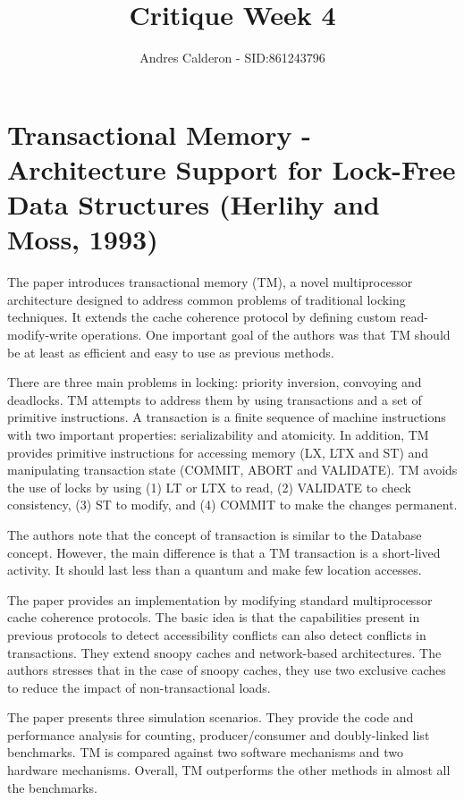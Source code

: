 \documentclass[a4paper,10pt]{scrartcl}
\title{Critique Week 4}
\author{Andres Calderon - SID:861243796}
\begin{document}
\maketitle
\thispagestyle{empty}

\section*{Transactional Memory - Architecture Support for Lock-Free Data Structures (Herlihy and Moss, 1993)}
The paper introduces transactional memory (TM), a novel multiprocessor  architecture designed to address common problems of traditional locking techniques.  It extends the cache coherence protocol by defining custom read-modify-write operations.  One important goal of the authors was that TM should be at least as efficient and easy to use as previous methods.

There are three main problems in locking: priority inversion, convoying and deadlocks.  TM attempts to address them by using transactions and a set of primitive instructions.  A transaction is a finite sequence of machine instructions with two important properties: serializability and atomicity. In addition, TM provides primitive instructions for accessing memory (LX, LTX and ST) and manipulating transaction state (COMMIT, ABORT and VALIDATE).  TM avoids the use of locks by using (1) LT or LTX to read, (2) VALIDATE to check consistency, (3) ST to modify, and (4) COMMIT to make the changes permanent.  

The authors note that the concept of transaction is similar to the Database concept. However, the main difference is that a TM transaction is a short-lived activity.  It should last less than a quantum and make few location accesses.

The paper provides an implementation by modifying standard multiprocessor cache coherence protocols.  The basic idea is that the capabilities present in previous protocols to detect accessibility conflicts can also detect conflicts in transactions. They extend snoopy caches and network-based architectures.  The authors stresses that in the case of snoopy caches, they use two exclusive caches to reduce the impact of non-transactional loads.

The paper presents three simulation scenarios.  They provide the code and performance analysis for counting, producer/consumer and doubly-linked list benchmarks. TM is compared against two software mechanisms and two hardware mechanisms.  Overall, TM outperforms the other methods in almost all the benchmarks.
\end{document}
